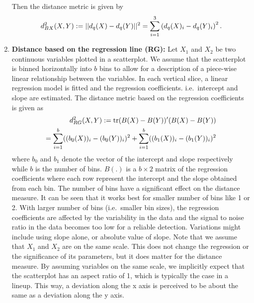 \documentclass[12pt]{article}\usepackage[]{graphicx}\usepackage[]{color}
\newcommand{\hh}[1]{{\color{magenta} #1}}
\begin{document}
\begin{enumerate}
Then the distance metric is given by
 \begin{equation}\nonumber
d^2_{BX}(X, Y) := || d_q(X) - d_q(Y)||^2 \\=
\sum_{i=1}^3 \left( d_q(X)_i - d_q(Y)_i\right)^2. \label{eq:BXdist}
\end{equation}

\item {\bf Distance based on the regression line (RG):}
Let $X_1$ and $X_2$ be two continuous variables plotted in a scatterplot. We assume that the scatterplot is binned horizontally into $b$ bins to allow for a description of a piece-wise linear relationship between the variables. In each vertical slice, a linear regression model is fitted and the regression coefficients. i.e.\ intercept and slope are estimated. The distance metric based on the regression coefficients is given as
 \begin{eqnarray}\nonumber
d^2_{RG}(X, Y) := \hbox{tr} (B(X) - B(Y))' (B(X) - B(Y))  \\
= \sum_{i=1}^b ((b_0(X))_i - (b_0(Y))_i)^2 + \sum_{i=1}^b ((b_1(X))_i - (b_1(Y))_i)^2\label{eq:drg}
\end{eqnarray}
where $b_0$ and $b_1$ denote the vector of the intercept and slope respectively while $b$ is the number of bins. $B(.)$ is a $b \times 2$ matrix of the regression coefficients where each row represent the  intercept and the slope obtained from each bin. The number of bins have a significant effect on the distance measure. It can be seen that it works best for smaller number of bins like 1 or 2.  With larger number of bins (i.e.\ smaller bin sizes), the regression coefficients are affected by the variability in the data and the signal to noise ratio in the data becomes too low for a reliable detection. %
Variations might include using slope alone, or absolute value of slope. Note that we assume that  $X_1$ and $X_2$ are on the same scale. This does not change the regression or the significance of its parameters, but it does matter for the distance measure. By assuming variables on the same scale, we implicitly expect that the scatterplot has an aspect ratio of 1, which is typically the case in a lineup. This way, a deviation along the x axis is perceived to be about the same as a deviation along the y axis. 


\end{enumerate}
\end{document}
